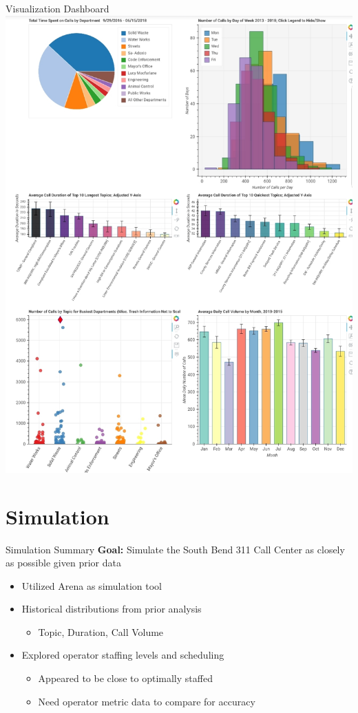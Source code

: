 \documentclass{beamer}
\begin{document}
\begin{frame}{Visualization Dashboard}
\centering
\includegraphics[scale=.15]{Dashboard}

\end{frame}


\section{Simulation}

\begin{frame}{Simulation Summary}
\textbf{Goal: }Simulate the South Bend 311 Call Center as closely as possible given prior data
\begin{itemize}
	\item Utilized Arena as simulation tool
	\item Historical distributions from prior analysis
	\begin{itemize}
		\item Topic, Duration, Call Volume
	\end{itemize}
	\item Explored operator staffing levels and scheduling
		\begin{itemize}
			\item Appeared to be close to optimally staffed
			\item Need operator metric data to compare for accuracy
		\end{itemize}
\end{itemize}

\end{frame}
\end{document}
